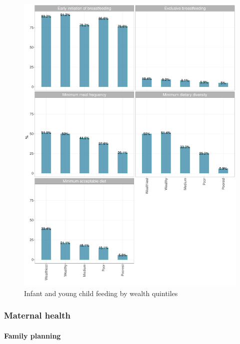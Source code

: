 \documentclass[12pt,a4paper]{article}
\let\oldparagraph\paragraph
\renewcommand{\paragraph}[1]{\oldparagraph{#1}\mbox{}}
\begin{document}
\begin{figure}[H]

{\centering \includegraphics{kayahReport_files/figure-latex/iycf2plot-1} 

}

\caption{Infant and young child feeding by wealth quintiles}\label{fig:iycf2plot}
\end{figure}

\newpage

\hypertarget{mhealth-results}{%
\subsubsection{Maternal health}\label{mhealth-results}}

\hypertarget{fplan-results}{%
\paragraph{Family planning}\label{fplan-results}}
\end{document}
